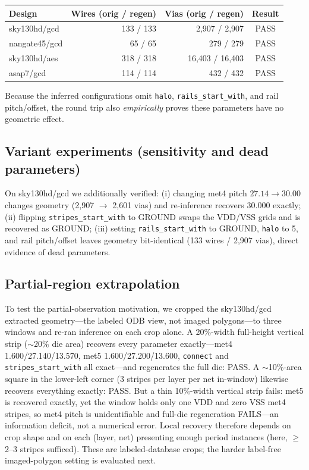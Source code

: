\documentclass[11pt]{article}
\begin{document}
\begin{center}
\begin{tabular}{lrrc}
\toprule
Design & Wires (orig / regen) & Vias (orig / regen) & Result \\
\midrule
sky130hd/gcd & 133 / 133 & 2,907 / 2,907 & PASS \\
nangate45/gcd & 65 / 65 & 279 / 279 & PASS \\
sky130hd/aes & 318 / 318 & 16,403 / 16,403 & PASS \\
asap7/gcd & 114 / 114 & 432 / 432 & PASS \\
\bottomrule
\end{tabular}
\end{center}

Because the inferred configurations omit \texttt{halo},
\texttt{rails\_start\_with}, and rail pitch/offset, the round trip also
\emph{empirically} proves these parameters have no geometric effect.

\subsection{Variant experiments (sensitivity and dead parameters)}

On sky130hd/gcd we additionally verified: (i) changing met4 pitch
$27.14 \to 30.00$ changes geometry (2,907 $\to$ 2,601 vias) and
re-inference recovers $30.000$ exactly; (ii) flipping
\texttt{stripes\_start\_with} to GROUND swaps the VDD/VSS grids and is
recovered as GROUND; (iii) setting \texttt{rails\_\allowbreak{}start\_with} to GROUND, \texttt{halo} to
5, and rail pitch/offset leaves geometry bit-identical
(133 wires / 2,907 vias), direct evidence of dead parameters.

\subsection{Partial-region extrapolation}
\label{sec:crop}

To test the partial-observation motivation, we cropped the
sky130hd/gcd extracted geometry---the labeled ODB view, not imaged
polygons---to three windows and re-ran inference on each crop alone.  A
20\%-width full-height vertical strip ($\sim$20\% die area) recovers every
parameter exactly---met4 1.600/27.140/13.570, met5 1.600/27.200/13.600,
\texttt{connect} and \texttt{stripes\_start\_with} all exact---and
regenerates
the full die: PASS.  A $\sim$10\%-area square in the lower-left corner
(3 stripes per layer per net in-window) likewise recovers everything
exactly: PASS.  But a thin 10\%-width vertical strip fails: met5 is
recovered exactly, yet the window holds only one VDD and zero VSS met4
stripes, so met4 pitch is unidentifiable and full-die regeneration
FAILS---an information deficit, not a numerical error.  Local recovery
therefore depends on crop shape and on each (layer, net) presenting
enough period instances (here, $\geq$2--3 stripes sufficed).  These are
labeled-database crops; the harder label-free imaged-polygon setting is
evaluated next.
\end{document}
